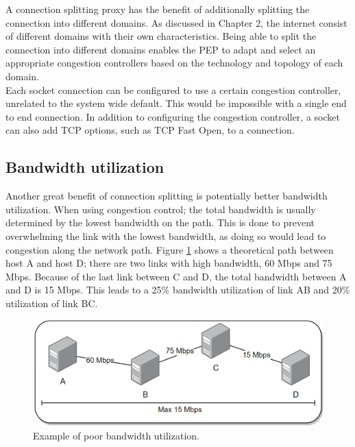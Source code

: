 \documentclass[a4paper,english, 11pt]{report}
\begin{document}
A connection splitting proxy has the benefit of additionally splitting the connection into different domains. As discussed in Chapter 2, the internet consist of different domains with their own characteristics. Being able to split the connection into different domains enables the PEP to adapt and select an appropriate congestion controllers based on the technology and topology of each domain.\\

Each socket connection can be configured to use a certain congestion controller, unrelated to the system wide default. This would be impossible with a single end to end connection. In addition to configuring the congestion controller, a socket can also add TCP options, such as TCP Fast Open, to a connection.

\subsection{Bandwidth utilization}
Another great benefit of connection splitting is potentially better bandwidth utilization. When using congestion control; the total bandwidth is usually determined by the lowest bandwidth on the path\cite{top_down}. This is done to prevent overwhelming the link with the lowest bandwidth, as doing so would lead to congestion along the network path. Figure \ref{fig:pep_bandwidth_bad} shows a theoretical path between host A and host D; there are two links with high bandwidth, 60 Mbps and 75 Mbps. Because of the last link between C and D, the total bandwidth between A and D is 15 Mbps. This leads to a 25\% bandwidth utilization of link AB and 20\% utilization of link BC.\\

\begin{figure}[h!] %
	\centering
	\includegraphics[scale=0.45]{../diagrams/drawio/bandwidth_bad.png}
  	\caption{Example of poor bandwidth utilization.}
  	\label{fig:pep_bandwidth_bad}
\end{figure}
\end{document}
